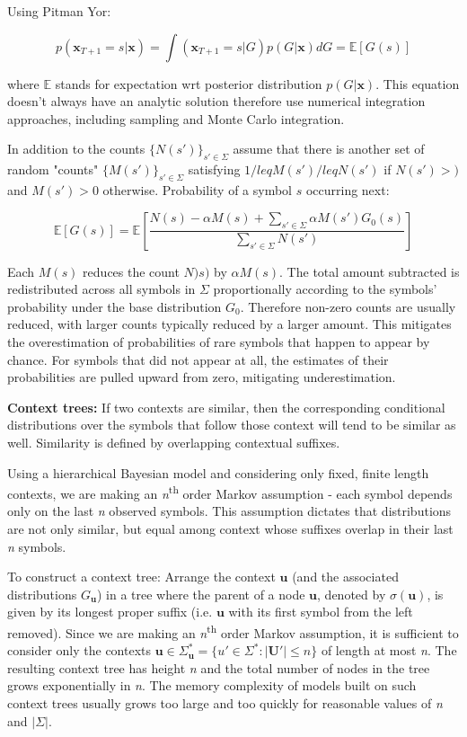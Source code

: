 Using Pitman Yor:

\begin{equation}
p(\textbf{x}_{T+1}=s|\textbf{x})=\int(\textbf{x}_{T+1}=s | G)p(G|\textbf{x})dG={\mathbb E} [G(s)]
\label{eq:seqMemPowerLaw}
\end{equation}

\noindent where $\mathbb E$ stands for expectation wrt posterior distribution $p(G|\textbf{x})$. This equation doesn't always have an analytic solution therefore use numerical integration approaches, including sampling and Monte Carlo integration. 

In addition to the counts $\{N(s')\}_{s' \in \Sigma}$ assume that there is another set of random "counts" $\{M(s')\}_{s' \in \Sigma}$ satisfying $1/leq M(s') /leq N(s')$ if $N(s') >)$ and $M(s')>0$ otherwise. Probability of a symbol $s$ occurring next:

\begin{equation}
\mathbb E [G(s)]=\mathbb E \left [\frac {N(s)-\alpha M(s)+\sum_{s' \in \Sigma}\alpha M(s')G_{0}(s)}{\sum_{s' \in \Sigma}N(s')}\right ]
\label{eq:seqMemPYP}
\end{equation}

\noindent Each $M(s)$ reduces the count $N)s)$ by $\alpha M(s)$. The total amount subtracted is redistributed across all symbols in $\Sigma$ proportionally according to the symbols' probability under the base distribution $G_{0}$. Therefore non-zero counts are usually reduced, with larger counts typically reduced by a larger amount. This mitigates the overestimation of probabilities of rare symbols that happen to appear by chance. For symbols that did not appear at all, the estimates of their probabilities are pulled upward from zero, mitigating underestimation.

\textbf{Context trees:} If two contexts are similar, then the corresponding conditional distributions over the symbols that follow those context will tend to be similar as well. Similarity is defined by overlapping contextual suffixes.

Using a hierarchical Bayesian model and considering only fixed, finite length contexts, we are making an \textit{n}\textsuperscript{th} order Markov assumption - each symbol depends only on the last \textit{n} observed symbols. This assumption dictates that distributions are not only similar, but equal among context whose suffixes overlap in their last \textit{n} symbols.

To construct a context tree: Arrange the context $\textbf{u}$ (and the associated distributions $G_{\textbf{u}}$) in a tree where the parent of a node $\textbf{u}$, denoted by $\sigma(\textbf{u})$, is given by its longest proper suffix (i.e. $\textbf{u}$ with its first symbol from the left removed). Since we are making an \textit{n}\textsuperscript{th} order Markov assumption, it is sufficient to consider only the contexts $\textbf{u} \in \Sigma_{\textbf{u}}^{*} = \{u' \in \Sigma^{*} :|\textbf{U}'|\leq n\}$ of length at most \textit{n}. The resulting context tree has height \textit{n} and the total number of nodes in the tree grows exponentially in \textit{n}. The memory complexity of models built on such context trees usually grows too large and too quickly for reasonable values of \textit{n} and $|\Sigma|$.

